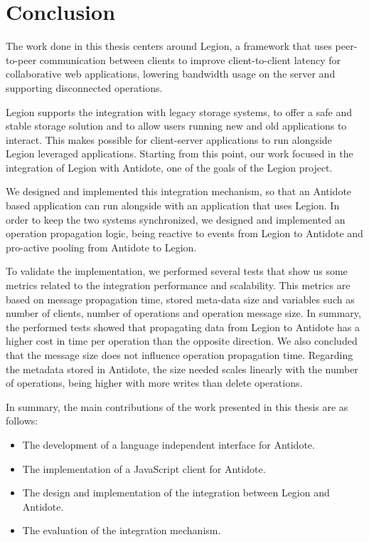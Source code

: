 \chapter{Conclusion}
\label{cha:conclusion}
The work done in this thesis centers around Legion, a framework that uses peer-to-peer communication between clients to improve client-to-client latency for collaborative web applications, lowering bandwidth usage on the server and supporting disconnected operations.\par
	Legion supports the integration with legacy storage systems, to offer a safe and stable storage solution and to allow users running new and old applications to interact. This makes possible for client-server applications to run alongside Legion leveraged applications. Starting from this point, our work focused in the integration of Legion with Antidote, one of the goals of the Legion project.\par
	We designed and implemented this integration mechanism, so that an Antidote based application can run alongside with an application that uses Legion. In order to keep the two systems synchronized, we designed and implemented an operation propagation logic, being reactive to events from Legion to Antidote and pro-active pooling from Antidote to Legion.\par
	To validate the implementation, we performed several tests that show us some metrics related to the integration performance and scalability. This metrics are based on message propagation time, stored meta-data size and variables such as number of clients, number of operations and operation message size. In summary, the performed tests showed that propagating data from Legion to Antidote has a higher cost in time per operation than the opposite direction. We also concluded that the message size does not influence operation propagation time. Regarding the metadata stored in Antidote, the size needed scales linearly with the number of operations, being higher with more writes than delete operations.\par
In summary, the main contributions of the work presented in this thesis are as follows:

\begin{itemize}
\item The development of a language independent interface for Antidote.
\item The implementation of a JavaScript client for Antidote.
\item The design and implementation of the integration between Legion and Antidote.
\item The evaluation of the integration mechanism.
\end{itemize}

